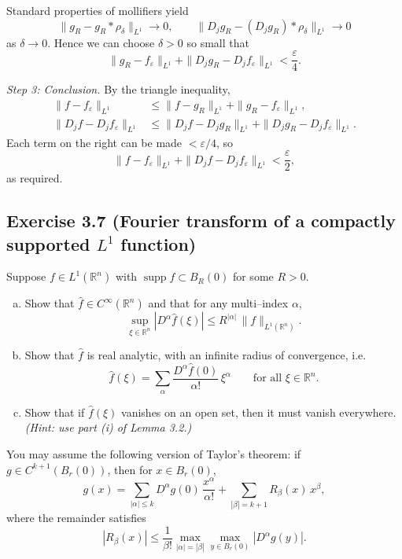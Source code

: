 \documentclass[12pt,a4paper]{article}
\theoremstyle{plain}
\theoremstyle{definition}
\theoremstyle{remark}
\theoremstyle{remark}
\begin{document}
Standard properties of mollifiers yield
\[
\|g_R-g_R * \rho_\delta\|_{L^1}\to 0,
\qquad
\|D_j g_R-(D_j g_R)*\rho_\delta\|_{L^1}\to 0
\]
as $\delta\to 0$. Hence we can choose $\delta>0$ so small that
\[
\|g_R-f_\varepsilon\|_{L^1}
+\|D_j g_R-D_j f_\varepsilon\|_{L^1}<\frac{\varepsilon}{4}.
\]

\emph{Step 3: Conclusion.}
By the triangle inequality,
\[
\begin{aligned}
	\|f-f_\varepsilon\|_{L^1}
	&\le \|f-g_R\|_{L^1}+\|g_R-f_\varepsilon\|_{L^1}, \\
	\|D_j f-D_j f_\varepsilon\|_{L^1}
	&\le \|D_j f-D_j g_R\|_{L^1}
	+\|D_j g_R-D_j f_\varepsilon\|_{L^1}.
\end{aligned}
\]
Each term on the right can be made $<\varepsilon/4$, so
\[
\|f-f_\varepsilon\|_{L^1}
+\|D_j f-D_j f_\varepsilon\|_{L^1}<\frac{\varepsilon}{2},
\]
as required.
\qedhere


\subsection*{Exercise 3.7 (Fourier transform of a compactly supported $L^1$ function)}



Suppose $f \in L^{1}(\mathbb{R}^{n})$ with $\operatorname{supp} f \subset B_{R}(0)$ for some $R>0$.

\begin{enumerate}[(a)]
	\item Show that $\widehat{f} \in C^{\infty}(\mathbb{R}^{n})$ and that for any multi–index $\alpha$,
	\[
	\sup_{\xi \in \mathbb{R}^{n}} \left| D^{\alpha} \widehat{f}(\xi) \right|
	\le R^{|\alpha|} \, \|f\|_{L^{1}(\mathbb{R}^{n})}.
	\]
	
	\item Show that $\widehat{f}$ is real analytic, with an infinite radius of convergence, i.e.
	\[
	\widehat{f}(\xi)
	= \sum_{\alpha} \frac{D^{\alpha} \widehat{f}(0)}{\alpha!} \, \xi^{\alpha}
	\qquad \text{for all } \xi \in \mathbb{R}^{n}.
	\]
	
	\item Show that if $\widehat{f}(\xi)$ vanishes on an open set, then it must vanish everywhere.
	\hfill\textit{(Hint: use part (i) of Lemma 3.2.)}
\end{enumerate}

You may assume the following version of Taylor's theorem: if $g \in C^{k+1}(B_{r}(0))$, then for $x \in B_{r}(0)$,
\[
g(x)
= \sum_{|\alpha|\le k} D^{\alpha} g(0)\,\frac{x^{\alpha}}{\alpha!}
+ \sum_{|\beta| = k+1} R_{\beta}(x)\,x^{\beta},
\]
where the remainder satisfies
\[
|R_{\beta}(x)|
\le \frac{1}{\beta!}
\max_{|\alpha|=|\beta|}
\max_{y\in B_{r}(0)} |D^{\alpha} g(y)|.
\]
\end{document}
